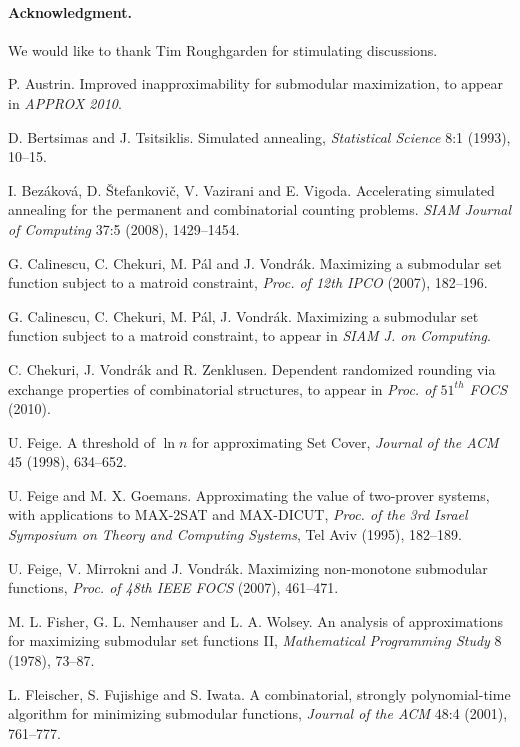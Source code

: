 \documentclass{article}[11pt]
\begin{document}
\paragraph{Acknowledgment.}
We would like to thank Tim Roughgarden for stimulating discussions.


\begin{thebibliography}{99}

 P. Austrin.
Improved inapproximability for submodular maximization,
to appear in {\em APPROX 2010}.

 D. Bertsimas and J. Tsitsiklis.
Simulated annealing,
{\em Statistical Science} 8:1 (1993), 10--15.

 I. Bez\'akov\'a, D. \v{S}tefankovi\v{c}, V. Vazirani and E. Vigoda.
Accelerating simulated annealing for the permanent and combinatorial counting problems.
{\em SIAM Journal of Computing} 37:5 (2008), 1429--1454.

 G. Calinescu, C. Chekuri, M. P\'al and J. Vondr\'ak.
Maximizing a submodular set function subject to a matroid constraint,
{\em Proc. of 12th IPCO} (2007), 182--196.

 G. Calinescu, C. Chekuri, M. P\'al, J. Vondr\'ak.
Maximizing a submodular set function subject to a matroid constraint,
to appear in \emph{SIAM J. on Computing}.

 C. Chekuri, J. Vondr\'ak and R. Zenklusen.
Dependent randomized rounding via exchange properties of combinatorial structures,
to appear in {\em Proc. of $51^{th}$ FOCS} (2010).

 U. Feige.
A threshold of $\ln n$ for approximating Set Cover,
{\em Journal of the ACM} 45 (1998), 634--652.

 U. Feige and M. X. Goemans.
Approximating the value of two-prover systems, with applications to MAX-2SAT and MAX-DICUT,
{\em Proc. of the 3rd Israel Symposium on Theory and Computing Systems}, Tel Aviv (1995), 182--189.

 U. Feige, V. Mirrokni and J. Vondr\'ak.
Maximizing non-monotone submodular functions,
\emph{Proc. of 48th IEEE FOCS} (2007), 461--471.

 M. L. Fisher, G. L. Nemhauser and L. A. Wolsey.
An analysis of approximations for maximizing submodular set functions II,
{\em Mathematical Programming Study} 8 (1978), 73--87.

  L. Fleischer, S. Fujishige and S. Iwata.
A combinatorial, strongly polynomial-time algorithm for minimizing submodular functions,
{\em Journal of the ACM} 48:4 (2001), 761--777.


\end{thebibliography}
\end{document}
